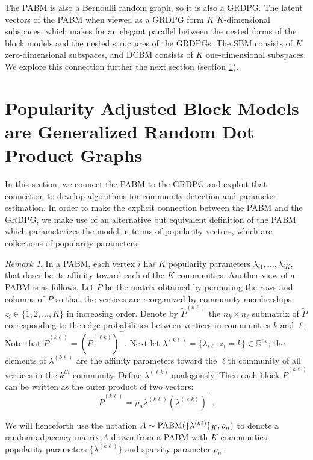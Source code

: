 \documentclass[
  12pt,
]{article}
\theoremstyle{definition}
\theoremstyle{definition}
\theoremstyle{definition}
\theoremstyle{definition}
\theoremstyle{remark}
\newtheorem{remark}{Remark}
\begin{document}
The PABM is also a Bernoulli random graph, so it is also a GRDPG.
The latent vectors of the PABM when viewed as a GRDPG form \(K\) \(K\)-dimensional subspaces, which makes for an elegant parallel between the nested forms of the block models and the nested structures of the GRDPGs: The SBM consists of \(K\) zero-dimensional subspaces, and DCBM consists of \(K\) one-dimensional subspaces.
We explore this connection further the next section (section \ref{sec:pabm-grdpg}).

\newpage

\hypertarget{sec:pabm-grdpg}{%
\section{Popularity Adjusted Block Models are Generalized Random Dot Product Graphs}\label{sec:pabm-grdpg}}

In this section, we connect the PABM to the GRDPG and exploit that connection to develop algorithms for community detection and parameter estimation.
In order to make the explicit connection between the PABM and the GRDPG, we make use of an alternative but equivalent definition of the PABM which parameterizes the model in terms of popularity vectors, which are collections of popularity parameters.

\begin{remark}
\label{rem:pabm_view2}
In a PABM, each vertex $i$ has $K$ popularity parameters $\lambda_{i1}, \dots, \lambda_{iK}$, that describe its affinity toward each of the $K$ communities. 
Another view of a PABM is as follows.
Let $\tilde{P}$ be the matrix obtained by permuting the rows and columns of $P$ so that the vertices are reorganized by community memberships $z_i \in \{1,2,\dots,K\}$ in increasing order. 
Denote by $\tilde{P}^{(k \ell)}$ the $n_k \times n_{\ell}$ submatrix of $\tilde{P}$ corresponding to the edge probabilities between vertices in communities $k$ and $\ell$. 
Note that $\tilde{P}^{(k \ell)} = (\tilde{P}^{(\ell k)})^\top$. 
Next let $\lambda^{(k \ell)} = \{\lambda_{i \ell} \colon z_i = k\} \in \mathbb{R}^{n_k}$; the elements of $\lambda^{(k \ell)}$ are the affinity parameters toward the $\ell$th community of all vertices in the $k^{th}$ community. 
Define $\lambda^{(\ell k)}$ analogously. 
Then each block $\tilde{P}^{(k \ell)}$ can be written as the outer product of two vectors:
\begin{equation} \label{eq:pabm}
\tilde{P}^{(k \ell)} = \rho_n \lambda^{(k \ell)} (\lambda^{(\ell k)})^{\top}.
\end{equation} 

We will henceforth use the notation \(A \sim \mathrm{PABM}(\{\lambda^{(k \ell)}\}_K, \rho_n)\) to denote a random adjacency matrix \(A\) drawn from a PABM with $K$ communities, popularity parameters \(\{\lambda^{(k \ell)}\}\) and sparsity parameter $\rho_n$.
\end{remark}
\end{document}
